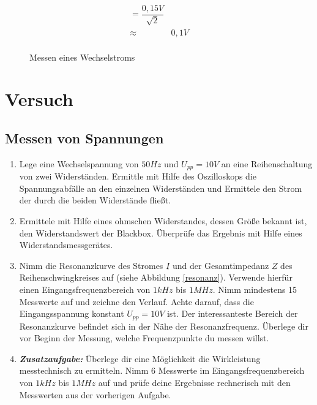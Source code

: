 \begin{figure}[H]
{\begin{minipage}[b]{5cm}
\begin{eqnarray*}
				= \dfrac{0,15V}{\sqrt{2}}\\
 		\approx	& 0,1V\\
\end{eqnarray*}
\end{minipage}
}
\caption{Messen eines Wechselstroms}
\end{figure}

\newpage
\section*{Versuch}

\subsection*{Messen von Spannungen}

\begin{enumerate}
\item Lege eine Wechselspannung von $50Hz$ und  $U_{pp} =10V$ an eine Reihenschaltung von zwei Widerständen. Ermittle mit Hilfe des Oszilloskops die Spannungsabfälle an den einzelnen Widerständen und Ermittele den Strom der durch die beiden Widerstände fließt.
\item Ermittele mit Hilfe eines ohmschen Widerstandes, dessen Größe bekannt ist, den Widerstandswert der Blackbox. Überprüfe das Ergebnis mit Hilfe eines Widerstandsmessgerätes.
\item Nimm die Resonanzkurve des Stromes $\underline{I}$ und der Gesamtimpedanz $\underline{Z}$ des Reihenschwingkreises auf (siehe Abbildung \ref{resonanz}). Verwende hierfür einen Eingangsfrequenzbereich von $1kHz$ bis $1MHz$. Nimm mindestens 15 Messwerte auf und zeichne den Verlauf. Achte darauf, dass die Eingangsspannung konstant $U_{pp} =10V$ ist. Der interessanteste Bereich der Resonanzkurve befindet sich in der Nähe der Resonanzfrequenz. Überlege dir vor Beginn der Messung, welche Frequenzpunkte du messen willst.
\item \emph{\textbf{Zusatzaufgabe:}} Überlege dir eine Möglichkeit die Wirkleistung messtechnisch zu ermitteln. Nimm 6 Messwerte im Eingangsfrequenzbereich von $1kHz$ bis $1MHz$ auf und prüfe deine Ergebnisse rechnerisch mit den Messwerten aus der vorherigen Aufgabe.
\end{enumerate}

